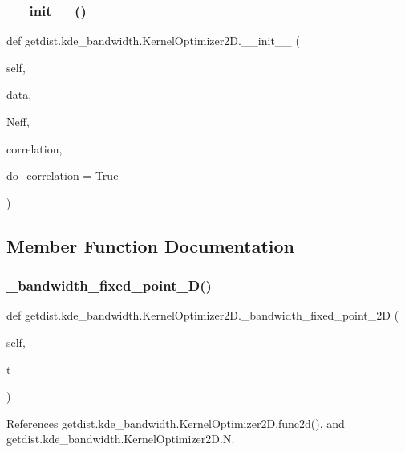 \subsubsection{\texorpdfstring{\+\_\+\+\_\+init\+\_\+\+\_\+()}{\_\_init\_\_()}}
{\footnotesize\ttfamily def getdist.\+kde\+\_\+bandwidth.\+Kernel\+Optimizer2\+D.\+\_\+\+\_\+init\+\_\+\+\_\+ (\begin{DoxyParamCaption}\item[{}]{self,  }\item[{}]{data,  }\item[{}]{Neff,  }\item[{}]{correlation,  }\item[{}]{do\+\_\+correlation = {\ttfamily True} }\end{DoxyParamCaption})}



\subsection{Member Function Documentation}
\mbox{\label{classgetdist_1_1kde__bandwidth_1_1KernelOptimizer2D_a4b4cbb301eb918bf8acdd2c318fe36ba}} 
\subsubsection{\texorpdfstring{\+\_\+bandwidth\+\_\+fixed\+\_\+point\+\_\+D()}{\_bandwidth\_fixed\_point\_2D()}}
{\footnotesize\ttfamily def getdist.\+kde\+\_\+bandwidth.\+Kernel\+Optimizer2\+D.\+\_\+bandwidth\+\_\+fixed\+\_\+point\+\_\+2D (\begin{DoxyParamCaption}\item[{}]{self,  }\item[{}]{t }\end{DoxyParamCaption})\hspace{0.3cm}{\ttfamily [private]}}



References getdist.\+kde\+\_\+bandwidth.\+Kernel\+Optimizer2\+D.\+func2d(), and getdist.\+kde\+\_\+bandwidth.\+Kernel\+Optimizer2\+D.\+N.

